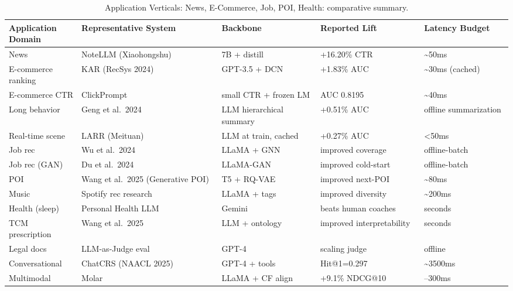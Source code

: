 \documentclass{article}
\begin{document}
\begin{table}[t]
\centering
\caption{Application Verticals: News, E-Commerce, Job, POI, Health: comparative summary.}
\label{tab:application-verticals-news-e-commerce-job-poi-health}
\begin{tabular}{>{\raggedright\arraybackslash}p{0.1488\linewidth}
  >{\raggedright\arraybackslash}p{0.2727\linewidth}
  >{\raggedright\arraybackslash}p{0.1983\linewidth}
  >{\raggedright\arraybackslash}p{0.2066\linewidth}
  >{\raggedright\arraybackslash}p{0.1736\linewidth}}
\toprule
Application Domain & Representative System & Backbone & Reported Lift & Latency Budget \\
\midrule
News & NoteLLM (Xiaohongshu) & 7B + distill & +16.20\% CTR & \textasciitilde50ms \\
E-commerce ranking & KAR (RecSys 2024) & GPT-3.5 + DCN & +1.83\% AUC & \textasciitilde30ms (cached) \\
E-commerce CTR & ClickPrompt & small CTR + frozen LM & AUC 0.8195 & \textasciitilde40ms \\
Long behavior & Geng et al.~2024 & LLM hierarchical summary & +0.51\% AUC & offline summarization \\
Real-time scene & LARR (Meituan) & LLM at train, cached & +0.27\% AUC & \textless50ms \\
Job rec & Wu et al.~2024 & LLaMA + GNN & improved coverage & offline-batch \\
Job rec (GAN) & Du et al.~2024 & LLaMA-GAN & improved cold-start & offline-batch \\
POI & Wang et al.~2025 (Generative POI) & T5 + RQ-VAE & improved next-POI & \textasciitilde80ms \\
Music & Spotify rec research & LLaMA + tags & improved diversity & \textasciitilde200ms \\
Health (sleep) & Personal Health LLM & Gemini & beats human coaches & seconds \\
TCM prescription & Wang et al.~2025 & LLM + ontology & improved interpretability & seconds \\
Legal docs & LLM-as-Judge eval & GPT-4 & scaling judge & offline \\
Conversational & ChatCRS (NAACL 2025) & GPT-4 + tools & Hit@1=0.297 & \textasciitilde3500ms \\
Multimodal & Molar & LLaMA + CF align & +9.1\% NDCG@10 & 100--300ms \\
\end{tabular}
\end{table}
\end{document}
